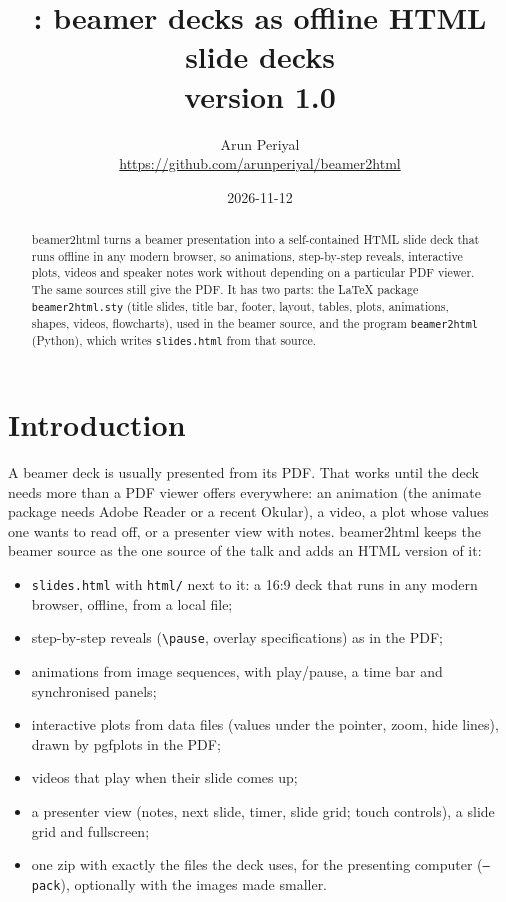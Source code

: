 \documentclass[a4paper,11pt]{article}
\title{\pkg: beamer decks as offline HTML slide decks\\[0.5ex]
  \large version 1.0}
\author{Arun Periyal\\ \url{https://github.com/arunperiyal/beamer2html}}
\date{2026-11-12}
\newcommand\pkg{\textsf{beamer2html}}
\newcommand\cs[1]{\texttt{\textbackslash #1}}
\newcommand\opt[1]{\texttt{#1}}
\newcommand\file[1]{\texttt{#1}}
\begin{document}
\maketitle

\begin{abstract}
\noindent \pkg{} turns a beamer presentation into a self-contained HTML slide
deck that runs offline in any modern browser, so animations, step-by-step
reveals, interactive plots, videos and speaker notes work without depending
on a particular PDF viewer. The same sources still give the PDF. It has two
parts: the LaTeX package \file{beamer2html.sty} (title slides, title bar,
footer, layout, tables, plots, animations, shapes, videos, flowcharts), used
in the beamer source, and the program \texttt{beamer2html} (Python), which
writes \file{slides.html} from that source.
\end{abstract}

\tableofcontents

\section{Introduction}

A beamer deck is usually presented from its PDF. That works until the deck
needs more than a PDF viewer offers everywhere: an animation (the
\textsf{animate} package needs Adobe Reader or a recent Okular), a video, a
plot whose values one wants to read off, or a presenter view with notes.
\pkg{} keeps the beamer source as the one source of the talk and adds an HTML
version of it:
\begin{itemize}
\item \file{slides.html} with \file{html/} next to it: a 16:9 deck that runs in
  any modern browser, offline, from a local file;
\item step-by-step reveals (\cs{pause}, overlay specifications) as in the PDF;
\item animations from image sequences, with play/pause, a time bar and
  synchronised panels;
\item interactive plots from data files (values under the pointer, zoom,
  hide lines), drawn by \textsf{pgfplots} in the PDF;
\item videos that play when their slide comes up;
\item a presenter view (notes, next slide, timer, slide grid; touch
  controls), a slide grid and fullscreen;
\item one zip with exactly the files the deck uses, for the presenting
  computer (\opt{--pack}), optionally with the images made smaller.
\end{itemize}
\end{document}

